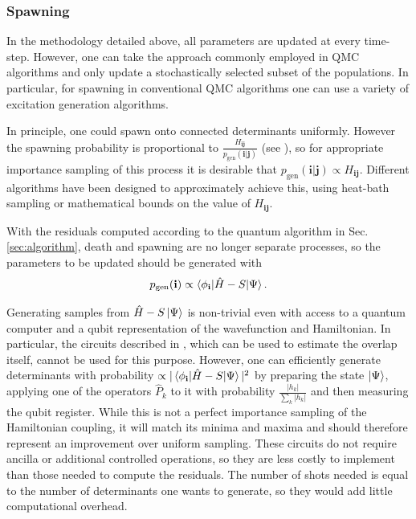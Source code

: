 \documentclass[%
 reprint,
 amsmath,amssymb,
 aps,
]{revtex4-2}
\begin{document}
\subsubsection{Spawning}\label{sec:spawn}
In the methodology detailed above, all parameters are updated at every time-step. However, one can take the approach commonly employed in QMC algorithms and only update a stochastically selected subset of the populations. In particular, for spawning in conventional QMC algorithms one can use a variety of excitation generation algorithms.\cite{Holmes2016,Neufeld2019} 

In principle, one could spawn onto connected determinants uniformly. However the spawning probability is proportional to $\frac{H_\mathbf{ij}}{p_\mathrm{gen}(\mathbf{i|j}) }$ (see ), so for appropriate importance sampling of this process it is desirable that ${p_\mathrm{gen}(\mathbf{i|j}) } \propto {H_\mathbf{ij}}$. Different algorithms have been designed to approximately achieve this, using heat-bath sampling\cite{Holmes2016} or mathematical bounds on the value of ${H_\mathbf{ij}}$.\cite{Neufeld2019}

With the residuals computed according to the quantum algorithm in Sec. \ref{sec:algorithm}, death and spawning are no longer separate processes, so the parameters to be updated should be generated with 
\begin{equation}
{p_\mathrm{gen}(\mathbf i) } \propto \braket{\phi_\mathbf{i}|\hat H - S |\Psi}.
\end{equation}

Generating samples from $\hat H - S \ket{\Psi}$ is non-trivial even with access to a quantum computer and a qubit representation of the wavefunction and Hamiltonian. In particular, the circuits described in , which can be used to estimate the overlap itself, cannot be used for this purpose. However, one can efficiently generate determinants with probability  $\propto |\braket{\phi_\mathbf{i}|\hat H - S|\Psi}|^2$ by preparing the state $\ket{\Psi}$, applying one of the operators $\hat P_k$ to it with probability $\frac{|h_k|}{\sum_k|h_k|}$ and then measuring the qubit register. While this is not a perfect importance sampling of the Hamiltonian coupling, it will match its minima and maxima and should therefore represent an improvement over uniform sampling. These circuits do not require ancilla or additional controlled operations, so they are less costly to implement than those needed to compute the residuals. The number of shots needed is equal to the number of determinants one wants to generate, so they would add little computational overhead.
\end{document}
